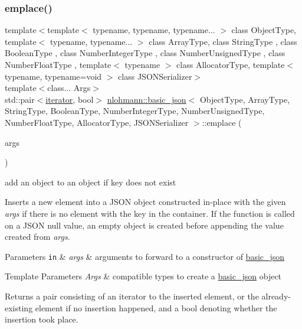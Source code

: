 \subsubsection{\texorpdfstring{emplace()}{emplace()}}
{\footnotesize\ttfamily template$<$template$<$ typename, typename, typename... $>$ class Object\+Type, template$<$ typename, typename... $>$ class Array\+Type, class String\+Type , class Boolean\+Type , class Number\+Integer\+Type , class Number\+Unsigned\+Type , class Number\+Float\+Type , template$<$ typename $>$ class Allocator\+Type, template$<$ typename, typename=void $>$ class J\+S\+O\+N\+Serializer$>$ \\
template$<$class... Args$>$ \\
std\+::pair$<$\hyperlink{classnlohmann_1_1basic__json_a099316232c76c034030a38faa6e34dca}{iterator}, bool$>$ \hyperlink{classnlohmann_1_1basic__json}{nlohmann\+::basic\+\_\+json}$<$ Object\+Type, Array\+Type, String\+Type, Boolean\+Type, Number\+Integer\+Type, Number\+Unsigned\+Type, Number\+Float\+Type, Allocator\+Type, J\+S\+O\+N\+Serializer $>$\+::emplace (\begin{DoxyParamCaption}\item[{Args \&\&...}]{args }\end{DoxyParamCaption})\hspace{0.3cm}{\ttfamily [inline]}}



add an object to an object if key does not exist 

Inserts a new element into a J\+S\+ON object constructed in-\/place with the given {\itshape args} if there is no element with the key in the container. If the function is called on a J\+S\+ON null value, an empty object is created before appending the value created from {\itshape args}.


\begin{DoxyParams}[1]{Parameters}
\mbox{\tt in}  & {\em args} & arguments to forward to a constructor of \hyperlink{classnlohmann_1_1basic__json}{basic\+\_\+json} \\
\hline
\end{DoxyParams}

\begin{DoxyTemplParams}{Template Parameters}
{\em Args} & compatible types to create a \hyperlink{classnlohmann_1_1basic__json}{basic\+\_\+json} object\\
\hline
\end{DoxyTemplParams}
\begin{DoxyReturn}{Returns}
a pair consisting of an iterator to the inserted element, or the already-\/existing element if no insertion happened, and a bool denoting whether the insertion took place.
\end{DoxyReturn}

